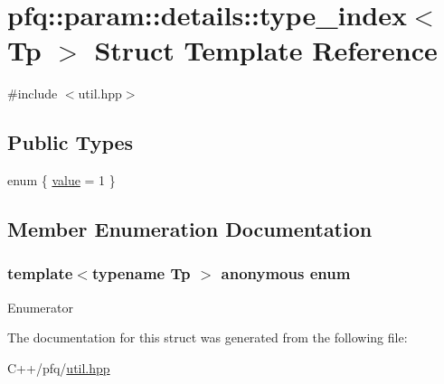 \hypertarget{structpfq_1_1param_1_1details_1_1type__index_3_01Tp_01_4}{}\section{pfq\+:\+:param\+:\+:details\+:\+:type\+\_\+index$<$ Tp $>$ Struct Template Reference}
\label{structpfq_1_1param_1_1details_1_1type__index_3_01Tp_01_4}


{\ttfamily \#include $<$util.\+hpp$>$}

\subsection*{Public Types}
\begin{DoxyCompactItemize}
\item 
enum \{ \hyperlink{structpfq_1_1param_1_1details_1_1type__index_3_01Tp_01_4_af9d771ebd1b38996ae3631c8330e6bdda74fe01056516d2934b6ce777009cffe4}{value} = 1
 \}
\end{DoxyCompactItemize}


\subsection{Member Enumeration Documentation}
\subsubsection[{\texorpdfstring{anonymous enum}{anonymous enum}}]{\setlength{\rightskip}{0pt plus 5cm}template$<$typename Tp $>$ anonymous enum}\hypertarget{structpfq_1_1param_1_1details_1_1type__index_3_01Tp_01_4_af9d771ebd1b38996ae3631c8330e6bdd}{}\label{structpfq_1_1param_1_1details_1_1type__index_3_01Tp_01_4_af9d771ebd1b38996ae3631c8330e6bdd}
\begin{Desc}
\item[Enumerator]\par
\begin{description}
\item[{\em 
value\hypertarget{structpfq_1_1param_1_1details_1_1type__index_3_01Tp_01_4_af9d771ebd1b38996ae3631c8330e6bdda74fe01056516d2934b6ce777009cffe4}{}\label{structpfq_1_1param_1_1details_1_1type__index_3_01Tp_01_4_af9d771ebd1b38996ae3631c8330e6bdda74fe01056516d2934b6ce777009cffe4}
}]\end{description}
\end{Desc}


The documentation for this struct was generated from the following file\+:\begin{DoxyCompactItemize}
\item 
C++/pfq/\hyperlink{util_8hpp}{util.\+hpp}\end{DoxyCompactItemize}
